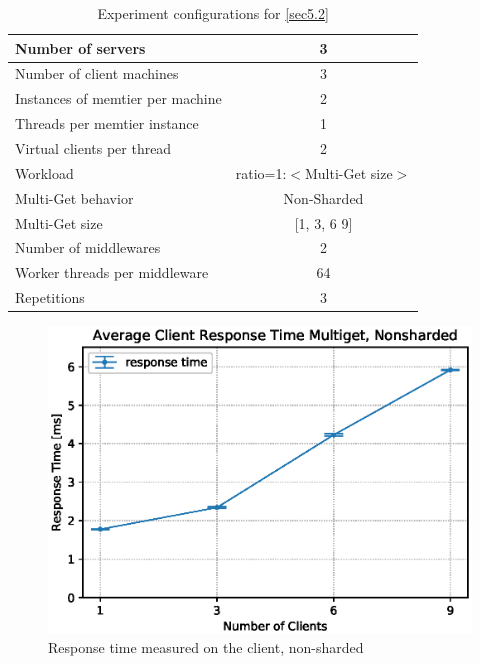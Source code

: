 \documentclass[11pt,a4paper]{article}
\begin{document}
\begin{center}
    \begin{table}
        \centering
    	\begin{tabular}{|l|c|}
    		\hline Number of servers                & 3                            \\ 
    		\hline Number of client machines        & 3                            \\ 
    		\hline Instances of memtier per machine & 2                            \\ 
    		\hline Threads per memtier instance     & 1                            \\
    		\hline Virtual clients per thread       & 2                		       \\ 
    		\hline Workload                         & ratio=1:$<$Multi-Get size$>$ \\
    		\hline Multi-Get behavior               & Non-Sharded                  \\
    		\hline Multi-Get size                   & [1, 3, 6 9]                  \\
    		\hline Number of middlewares            & 2                            \\
    		\hline Worker threads per middleware    & 64                           \\
    		\hline Repetitions                      & 3                            \\ 
    		\hline 
    	\end{tabular}
    	\caption{Experiment configurations for \autoref{sec5.2}} \label{exp5-2}
    \end{table}
\end{center}

\begin{figure}
    \centering
    \includegraphics[width=0.7\linewidth]{plots/5b_latencyMemtier.eps}
    \caption{Response time measured on the client, non-sharded}
    \label{fig:5-2-responsetime}
\end{figure}
\end{document}
